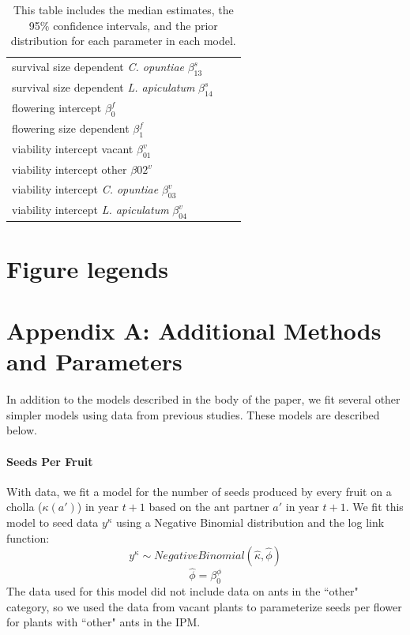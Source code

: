 \documentclass[11pt]{article}
\begin{document}
\begin{table}[]
\begin{tabular}{l|l|l}
    survival size dependent \textit{C. opuntiae} $\beta_{13}^s$ & & \\
    survival size dependent \textit{L. apiculatum} $\beta_{14}^s$ & & \\
    \hline
    flowering intercept $\beta_0^f$ & & \\
    flowering size dependent $\beta_1^f$ & & \\
    \hline
    viability intercept vacant $\beta_01^v$ & & \\
    viability intercept other $\beta02^v$ & & \\
    viability intercept \textit{C. opuntiae} $\beta_03^v$ & & \\
    viability intercept \textit{L. apiculatum} $\beta_04^v$ & & 

  \end{tabular}
  \caption{This table includes the median estimates, the 95$\%$ confidence intervals, and the prior distribution for each parameter in each model.}
  \label{tab:Params}
  \end{table}

\section*{Figure legends}



\section*{Appendix A: Additional Methods and Parameters}
In addition to the models described in the body of the paper, we fit several other simpler models using data from previous studies.
These models are described below.

\paragraph{Seeds Per Fruit}
With data\cite{Miller2006}, we fit a model for the number of seeds produced by every fruit on a cholla ($\kappa(a')$) in year $t+1$ based on the ant partner $a'$ in year $t+1$.
We fit this model to seed data $y^{\kappa}$ using a Negative Binomial distribution and the log link function: 
$$y^{\kappa} \sim  Negative Binomial(\hat{\kappa},\hat{\phi})$$
$$\hat{\phi} = \beta_{0}^{\phi}$$
The data used for this model did not include data on ants in the ``other" category, so we used the data from vacant plants to parameterize seeds per flower for plants with ``other" ants in the IPM.
\end{document}
